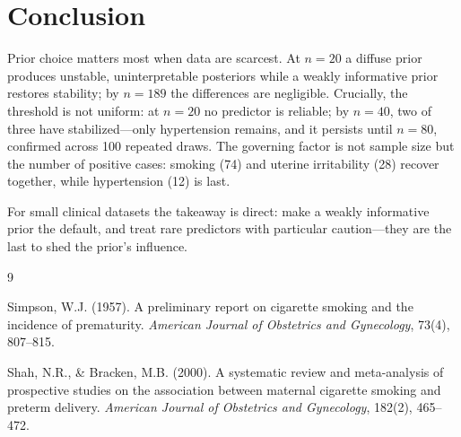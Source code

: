 \documentclass[11pt]{article}
\begin{document}
\section{Conclusion}

Prior choice matters most when data are scarcest. At $n = 20$ a
diffuse prior produces unstable, uninterpretable posteriors while a
weakly informative prior restores stability; by $n = 189$ the
differences are negligible. Crucially, the threshold is not uniform:
at $n = 20$ no predictor is reliable; by $n = 40$, two of three
have stabilized---only hypertension remains, and it persists until
$n = 80$, confirmed across 100 repeated draws. The governing factor is not
sample size but the number of positive cases: smoking (74) and uterine
irritability (28) recover together, while hypertension (12) is last.

For small clinical datasets the takeaway is direct: make a weakly
informative prior the default, and treat rare predictors with
particular caution---they are the last to shed the prior's influence.

\begin{thebibliography}{9}

Simpson, W.J. (1957).
A preliminary report on cigarette smoking and the incidence of
prematurity.
\textit{American Journal of Obstetrics and Gynecology}, 73(4), 807--815.

Shah, N.R., \& Bracken, M.B. (2000).
A systematic review and meta-analysis of prospective studies on the
association between maternal cigarette smoking and preterm delivery.
\textit{American Journal of Obstetrics and Gynecology}, 182(2), 465--472.

\end{thebibliography}
\end{document}
